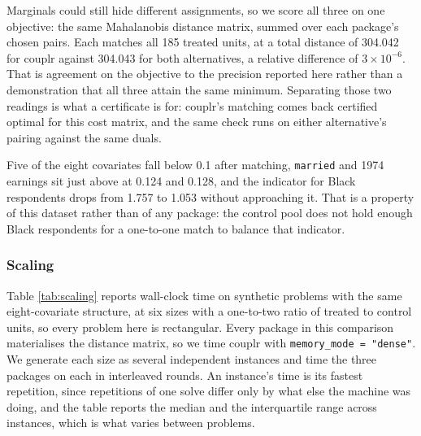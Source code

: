 Marginals could still hide different assignments, so we score all three on one objective: the same
Mahalanobis distance matrix, summed over each package's chosen pairs. Each matches all 185 treated
units, at a total distance of 304.042 for couplr against 304.043 for both
alternatives, a relative difference of \(3 \times 10^{-6}\). That is agreement
on the objective to the precision reported here rather than a demonstration
that all three attain the same minimum. Separating those two readings is
what a certificate is for: couplr's matching comes back certified optimal for
this cost matrix, and the same check runs on either alternative's pairing
against the same duals.

Five of the eight covariates fall below 0.1 after matching, \texttt{married} and 1974
earnings sit just above at 0.124 and 0.128, and the indicator for Black
respondents drops from 1.757 to 1.053 without approaching it. That is a
property of this dataset rather than of any package: the control pool does not
hold enough Black respondents for a one-to-one match to balance that
indicator.

\FloatBarrier

\subsubsection{Scaling}\label{scaling}

Table \ref{tab:scaling} reports wall-clock time on synthetic problems with the
same eight-covariate structure, at six sizes with a one-to-two ratio of treated
to control units, so every problem here is rectangular. Every package in this
comparison materialises the distance matrix, so we time couplr with
\texttt{memory\_mode\ =\ "dense"}. We generate each size as several independent
instances and time the three packages on each in interleaved rounds. An
instance's time is its fastest repetition, since repetitions of one solve differ
only by what else the machine was doing, and the table reports the median and
the interquartile range across instances, which is what varies between problems.

